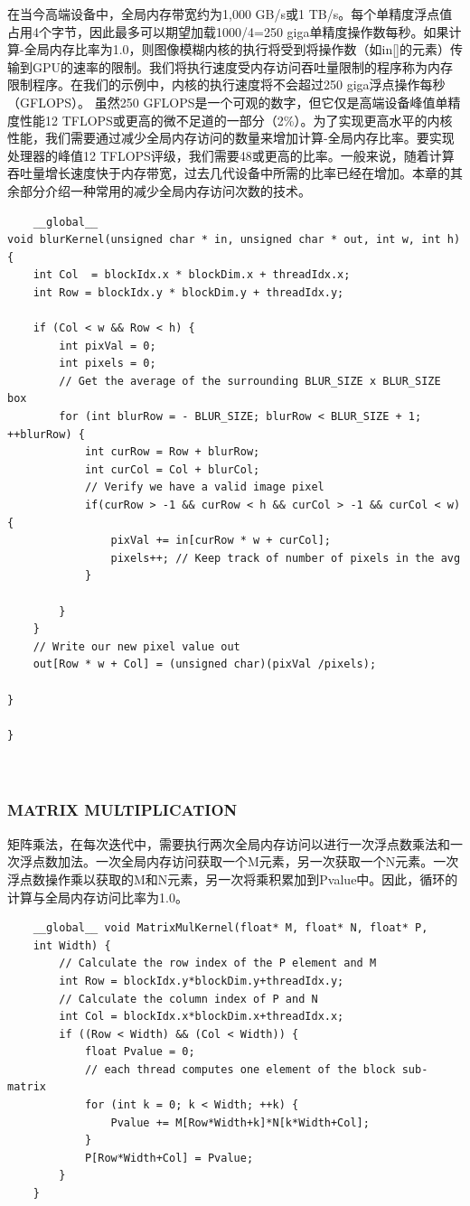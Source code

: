 \documentclass[11pt]{ctexart}
\begin{document}
在当今高端设备中，全局内存带宽约为1,000 GB/s或1 TB/s。每个单精度浮点值占用4个字节，因此最多可以期望加载1000/4=250 giga单精度操作数每秒。如果计算-全局内存比率为1.0，则图像模糊内核的执行将受到将操作数（如in[]的元素）传输到GPU的速率的限制。我们将执行速度受内存访问吞吐量限制的程序称为内存限制程序。在我们的示例中，内核的执行速度将不会超过250 giga浮点操作每秒（GFLOPS）。
虽然250 GFLOPS是一个可观的数字，但它仅是高端设备峰值单精度性能12 TFLOPS或更高的微不足道的一部分（2\%）。为了实现更高水平的内核性能，我们需要通过减少全局内存访问的数量来增加计算-全局内存比率。要实现处理器的峰值12 TFLOPS评级，我们需要48或更高的比率。一般来说，随着计算吞吐量增长速度快于内存带宽，过去几代设备中所需的比率已经在增加。本章的其余部分介绍一种常用的减少全局内存访问次数的技术。




\begin{lstlisting}
	__global__
void blurKernel(unsigned char * in, unsigned char * out, int w, int h){
	int Col  = blockIdx.x * blockDim.x + threadIdx.x;
	int Row = blockIdx.y * blockDim.y + threadIdx.y;
	
	if (Col < w && Row < h) {
		int pixVal = 0;
		int pixels = 0;	
		// Get the average of the surrounding BLUR_SIZE x BLUR_SIZE box
		for (int blurRow = - BLUR_SIZE; blurRow < BLUR_SIZE + 1; ++blurRow) {
			int curRow = Row + blurRow;
			int curCol = Col + blurCol;
			// Verify we have a valid image pixel
			if(curRow > -1 && curRow < h && curCol > -1 && curCol < w) {
				pixVal += in[curRow * w + curCol];
				pixels++; // Keep track of number of pixels in the avg	
			}		
			
		}
	}
	// Write our new pixel value out
	out[Row * w + Col] = (unsigned char)(pixVal /pixels); 
	
}

}



\end{lstlisting}

\subsubsection{MATRIX MULTIPLICATION}



矩阵乘法，在每次迭代中，需要执行两次全局内存访问以进行一次浮点数乘法和一次浮点数加法。一次全局内存访问获取一个M元素，另一次获取一个N元素。一次浮点数操作乘以获取的M和N元素，另一次将乘积累加到Pvalue中。因此，循环的计算与全局内存访问比率为1.0。

\begin{lstlisting}
	__global__ void MatrixMulKernel(float* M, float* N, float* P,
	int Width) {
		// Calculate the row index of the P element and M
		int Row = blockIdx.y*blockDim.y+threadIdx.y;
		// Calculate the column index of P and N
		int Col = blockIdx.x*blockDim.x+threadIdx.x;
		if ((Row < Width) && (Col < Width)) {
			float Pvalue = 0;
			// each thread computes one element of the block sub-matrix
			for (int k = 0; k < Width; ++k) {
				Pvalue += M[Row*Width+k]*N[k*Width+Col];
			}
			P[Row*Width+Col] = Pvalue;
		}
	}
\end{lstlisting}
\end{document}
